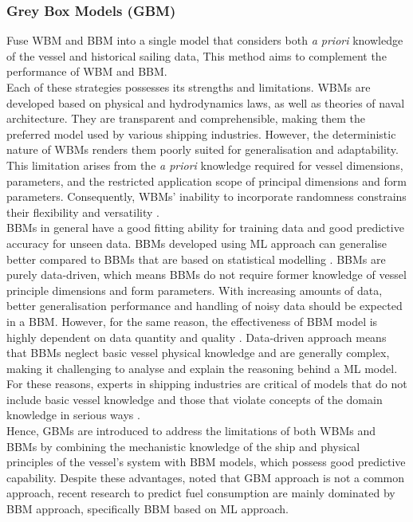 \subsubsection*{\textbf{Grey Box Models (GBM)}} Fuse WBM and BBM into a single model that considers both \emph{a priori} knowledge of the vessel and historical sailing data, This method aims to complement the performance of WBM and BBM.\\

Each of these strategies possesses its strengths and limitations. WBMs are developed based on physical and hydrodynamics laws, as well as theories of naval architecture. They are transparent and comprehensible, making them the preferred model used by various shipping industries. However, the deterministic nature of WBMs renders them poorly suited for generalisation and adaptability. This limitation arises from the \emph{a priori} knowledge required for vessel dimensions, parameters, and the restricted application scope of principal dimensions and form parameters. Consequently, WBMs' inability to incorporate randomness constrains their flexibility and versatility .\\

BBMs in general have a good fitting ability for training data and good predictive accuracy for unseen data. BBMs developed using ML approach can generalise better compared to BBMs that are based on statistical modelling . BBMs are purely data-driven, which means BBMs do not require former knowledge of vessel principle dimensions and form parameters. With increasing amounts of data, better generalisation performance and handling of noisy data should be expected in a BBM. However, for the same reason, the effectiveness of BBM model is highly dependent on data quantity and quality . Data-driven approach means that BBMs neglect basic vessel physical knowledge and are generally complex, making it challenging to analyse and explain the reasoning behind a ML model. For these reasons, experts in shipping industries are critical of models that do not include basic vessel knowledge and those that violate concepts of the domain knowledge in serious ways .\\   

Hence, GBMs are introduced to address the limitations of both WBMs and BBMs by combining the mechanistic knowledge of the ship and physical principles of the vessel's system with BBM models, which possess good predictive capability. Despite these advantages,  noted that GBM approach is not a common approach, recent research to predict fuel consumption are mainly dominated by BBM approach, specifically BBM based on ML approach.\\

